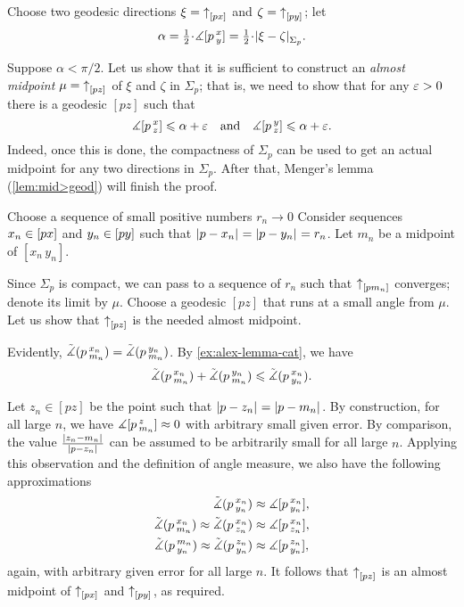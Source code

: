 Choose two geodesic directions $\xi={\uparrow}_{[{p}{x}]_{{}}}$ and $\zeta={\uparrow}_{[{p}{y}]_{{}}}$;
let 
\[\alpha\z=\tfrac12\cdot \mangle \hinge pxy=\tfrac12\cdot \dist{\xi}{\zeta}{\Sigma_p}.\]

Suppose $\alpha<\pi/2$.
Let us show that it is sufficient to construct an \emph{almost midpoint} $\mu={\uparrow}_{[{p}{z}]_{{}}}$ of $\xi$ and $\zeta$ in $\Sigma_p$;
that is, we need to show that for any $\varepsilon>0$ there is a geodesic $[pz]$ such that
\[\measuredangle[p\,{}^{x}_{z}]\leqslant \alpha+\varepsilon
\quad\text{and}\quad
\measuredangle[p\,{}^{y}_{z}]\leqslant \alpha+\varepsilon.\]
Indeed, once this is done, the compactness of $\Sigma_p$ can be used to get an actual midpoint for any two directions in $\Sigma_p$.
After that, Menger's lemma (\ref{lem:mid>geod}) will finish the proof.

Choose a sequence of small positive numbers $r_n\to0$
Consider sequences $x_n\in [px]$ and $y_n\in [py]$ such that $|{p}-{x_n}|_{}^{{}}=|{p}-{y_n}|_{}^{{}}=r_n$.
Let $m_n$ be a midpoint of $[x_n\,y_n]$.

Since $\Sigma_p$ is compact, we can pass to a sequence of $r_n$ such that 
${\uparrow}_{[{p}{m_n}]_{{}}}$ converges;
denote its limit by $\mu$.
Choose a geodesic $[pz]$ that runs at a small angle from $\mu$.
Let us show that ${\uparrow}_{[{p}{z}]_{{}}}$ is the needed almost midpoint.

Evidently, $\tilde\measuredangle(p\,{}^{x_n}_{m_n})=\tilde\measuredangle(p\,{}^{y_n}_{m_n})$.
By \ref{ex:alex-lemma-cat}, we have
\[\tilde\measuredangle(p\,{}^{x_n}_{m_n})+\tilde\measuredangle(p\,{}^{y_n}_{m_n})\leqslant \tilde\measuredangle(p\,{}^{x_n}_{y_n}).\]

Let $z_n\in [pz]$ be the point such that $|{p}-{z_n}|_{}^{{}}=|{p}-{m_n}|_{}^{{}}$.
By construction, for all large $n$, we have $\measuredangle[p\,{}^{z}_{m_n}]\approx0$  with arbitrary small given error.
By comparison, the value $\frac{|{z_n}-{m_n}|_{}^{{}}}{|{p}-{z_n}|_{}^{{}}}$ can be assumed to be arbitrarily small for all large $n$.
Applying this observation and the definition of angle measure, we also have the following approximations
\begin{align*}
\tilde\measuredangle(p\,{}^{x_n}_{y_n})&\approx \measuredangle[p\,{}^{x_n}_{y_n}],
\\
\tilde\measuredangle(p\,{}^{x_n}_{m_n})\approx\tilde\measuredangle(p\,{}^{x_n}_{z_n})&\approx\measuredangle[p\,{}^{x_n}_{z_n}],
\\
\tilde\measuredangle(p\,{}^{m_n}_{y_n})\approx\tilde\measuredangle(p\,{}^{z_n}_{y_n})&\approx\measuredangle[p\,{}^{z_n}_{y_n}],
\end{align*}
again, with arbitrary given error for all large $n$.
It follows that ${\uparrow}_{[{p}{z}]_{{}}}$ is an almost midpoint of ${\uparrow}_{[{p}{x}]_{{}}}$ and ${\uparrow}_{[{p}{y}]_{{}}}$, as required.
\qeds

